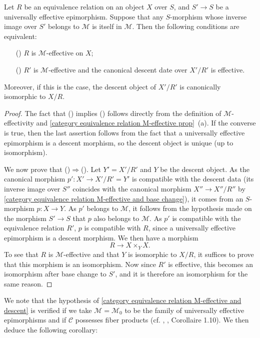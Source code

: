 \begin{proposition}\label{category equivalence relation M-effective and descent}
Let $R$ be an equivalence relation on an object $X$ over $S$, and $S'\to S$ be a universally effective epimorphism. Suppose that any $S$-morphism whose inverse image over $S'$ belongs to $\mathcal{M}$ is itself in $\mathcal{M}$. Then the following conditions are equivalent:
\begin{enumerate}
    \item[(\rmnum{1})] $R$ is $\mathcal{M}$-effective on $X$;
    \item[(\rmnum{2})] $R'$ is $\mathcal{M}$-effective and the canonical descent date over $X'/R'$ is effective.
\end{enumerate}
Moreover, if this is the case, the descent object of $X'/R'$ is canonically isomorphic to $X/R$.
\end{proposition}
\begin{proof}
The fact that () implies () follows directly from the definition of $\mathcal{M}$-effectivity and \cref{category equivalence relation M-effective prop}~(a). If the converse is true, then the last assertion follows from the fact that a universally effective epimorphism is a descent morphism, so the descent object is unique (up to isomorphism).\par
We now prove that ()$\Rightarrow$(). Let $Y'=X'/R'$ and $Y$ be the descent object. As the canonical morphism $p':X'\to X'/R'=Y'$ is compatible with the descent data (its inverse image over $S''$ coincides with the canonical morphism $X''\to X''/R''$ by \cref{category equivalence relation M-effective and base change}), it comes from an $S$-morphism $p:X\to Y$. As $p'$ belongs to $\mathcal{M}$, it follows from the hypothesis made on the morphism $S'\to S$ that $p$ also belongs to $\mathcal{M}$. As $p'$ is compatible with the equivalence relation $R'$, $p$ is compatible with $R$, since a universally effective epimorphism is a descent morphism. We then have a morphism
\[R\to X\times_YX.\]
To see that $R$ is $\mathcal{M}$-effective and that $Y$ is isomorphic to $X/R$, it suffices to prove that this morphism is an isomorphism. Now since $R'$ is effective, this becomes an isomorphism after base change to $S'$, and it is therefore an isomorphism for the same reason.
\end{proof}

We note that the hypothesis of \cref{category equivalence relation M-effective and descent} is verified if we take $\mathcal{M}=\mathcal{M}_0$ to be the family of universally effective epimorphisms and if $\mathcal{C}$ possesses fiber products (cf. \cite{SGA3-1}, , Corollaire 1.10). We then deduce the following corollary:

